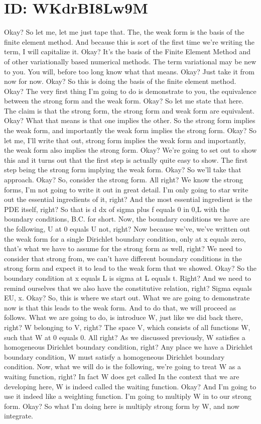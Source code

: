 \documentclass[10pt]{article}
\begin{document}
\section*{ID: WKdrBI8Lw9M}
Okay? So let me, let me just tape that. The, the weak form is the basis of the finite element method. And because this is sort of the first time we're writing the term, I will capitalize it. Okay? It's the basis of the Finite Element Method and of other variationally based numerical methods. The term variational may be new to you. You will, before too long know what that means. Okay? Just take it from now for now. Okay? So this is doing the basis of the finite element method. Okay? The very first thing I'm going to do is demonstrate to you, the equivalence between the strong form and the weak form. Okay? So let me state that here. The claim is that the strong form, the strong form and weak form are equivalent. Okay? What that means is that one implies the other. So the strong form implies the weak form, and importantly the weak form implies the strong form. Okay? So let me, I'll write that out, strong form implies the weak form and importantly, the weak form also implies the strong form. Okay? We're going to set out to show this and it turns out that the first step is actually quite easy to show. The first step being the strong form implying the weak form. Okay? So we'll take that approach. Okay? So, consider the strong form. All right? We know the strong forms, I'm not going to write it out in great detail. I'm only going to star write out the essential ingredients of it, right? And the most essential ingredient is the PDE itself, right? So that is d dx of sigma plus f equals 0 in 0,L with the boundary conditions, B.C. for short. Now, the boundary conditions we have are the following, U at 0 equals U not, right? Now because we've, we've written out the weak form for a single Dirichlet boundary condition, only at x equals zero, that's what we have to assume for the strong form as well, right? We need to consider that strong from, we can't have different boundary conditions in the strong form and expect it to lead to the weak form that we showed. Okay? So the boundary condition at x equals L is sigma at L equals t. Right? And we need to remind ourselves that we also have the constitutive relation, right? Sigma equals EU, x. Okay? So, this is where we start out. What we are going to demonstrate now is that this leads to the weak form. And to do that, we will proceed as follows. What we are going to do, is introduce W, just like we did back there, right? W belonging to V, right? The space V, which consists of all functions W, such that W at 0 equals 0. All right? As we discussed previously, W satisfies a homogeneous Dirichlet boundary condition, right? Any place we have a Dirichlet boundary condition, W must satisfy a homogeneous Dirichlet boundary condition. Now, what we will do is the following, we're going to treat W as a waiting function, right? In fact W does get called In the context that we are developing here, W is indeed called the waiting function. Okay? And I'm going to use it indeed like a weighting function. I'm going to multiply W in to our strong form. Okay? So what I'm doing here is multiply strong form by W, and now integrate. 
\end{document}
